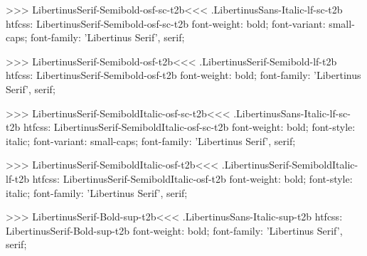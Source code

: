 {{{{{{{{{{>>>
\<LibertinusSerif-Semibold-osf-sc-t2b\><<<
.LibertinusSans-Italic-lf-sc-t2b
htfcss:  LibertinusSerif-Semibold-osf-sc-t2b  font-weight: bold; font-variant: small-caps; font-family: 'Libertinus Serif', serif;

>>>
\<LibertinusSerif-Semibold-osf-t2b\><<<
.LibertinusSerif-Semibold-lf-t2b
htfcss:  LibertinusSerif-Semibold-osf-t2b  font-weight: bold; font-family: 'Libertinus Serif', serif;

>>>
\<LibertinusSerif-SemiboldItalic-osf-sc-t2b\><<<
.LibertinusSans-Italic-lf-sc-t2b
htfcss:  LibertinusSerif-SemiboldItalic-osf-sc-t2b  font-weight: bold; font-style: italic; font-variant: small-caps; font-family: 'Libertinus Serif', serif;

>>>
\<LibertinusSerif-SemiboldItalic-osf-t2b\><<<
.LibertinusSerif-SemiboldItalic-lf-t2b
htfcss:  LibertinusSerif-SemiboldItalic-osf-t2b  font-weight: bold; font-style: italic; font-family: 'Libertinus Serif', serif;

>>>
\<LibertinusSerif-Bold-sup-t2b\><<<
.LibertinusSans-Italic-sup-t2b
htfcss:  LibertinusSerif-Bold-sup-t2b  font-weight: bold; font-family: 'Libertinus Serif', serif;

}}}}}}}}}}
